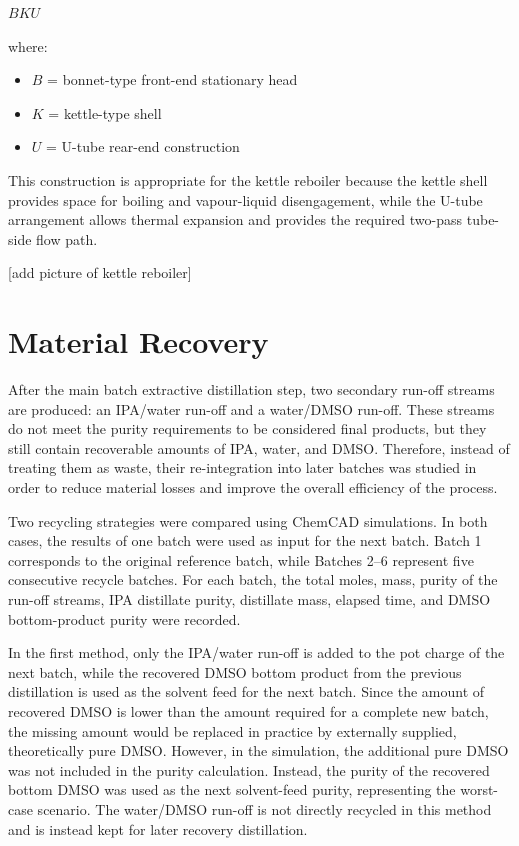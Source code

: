 \(BKU\)

where:

\begin{itemize}
\tightlist
\item
  \(B\) = bonnet-type front-end stationary head
\item
  \(K\) = kettle-type shell
\item
  \(U\) = U-tube rear-end construction
\end{itemize}

This construction is appropriate for the kettle reboiler because the
kettle shell provides space for boiling and vapour-liquid disengagement,
while the U-tube arrangement allows thermal expansion and provides the
required two-pass tube-side flow path.

{[}add picture of kettle reboiler{]}

\chapter{Material Recovery}\label{material-recovery}

After the main batch extractive distillation step, two secondary run-off
streams are produced: an IPA/water run-off and a water/DMSO run-off.
These streams do not meet the purity requirements to be considered final
products, but they still contain recoverable amounts of IPA, water, and
DMSO. Therefore, instead of treating them as waste, their re-integration
into later batches was studied in order to reduce material losses and
improve the overall efficiency of the process.

Two recycling strategies were compared using ChemCAD simulations. In
both cases, the results of one batch were used as input for the next
batch. Batch 1 corresponds to the original reference batch, while
Batches 2--6 represent five consecutive recycle batches. For each batch,
the total moles, mass, purity of the run-off streams, IPA distillate
purity, distillate mass, elapsed time, and DMSO bottom-product purity
were recorded.

In the first method, only the IPA/water run-off is added to the pot
charge of the next batch, while the recovered DMSO bottom product from
the previous distillation is used as the solvent feed for the next
batch. Since the amount of recovered DMSO is lower than the amount
required for a complete new batch, the missing amount would be replaced
in practice by externally supplied, theoretically pure DMSO. However, in
the simulation, the additional pure DMSO was not included in the purity
calculation. Instead, the purity of the recovered bottom DMSO was used
as the next solvent-feed purity, representing the worst-case scenario.
The water/DMSO run-off is not directly recycled in this method and is
instead kept for later recovery distillation.

